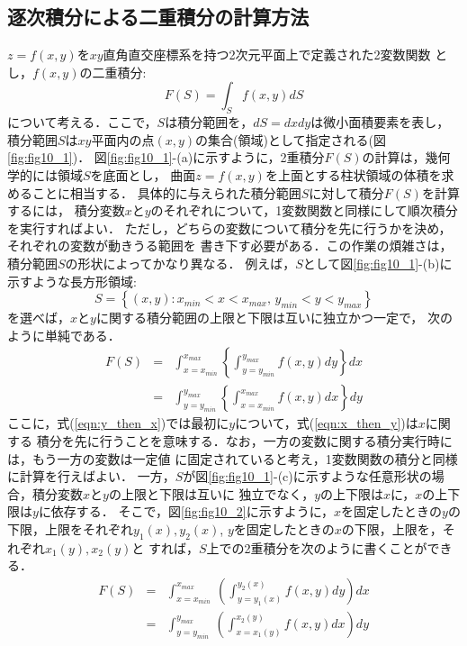 \documentclass[10pt,a4j]{jarticle}
\begin{document}
\subsection{逐次積分による二重積分の計算方法}
$z=f(x,y)$を$xy$直角直交座標系を持つ2次元平面上で定義された2変数関数
とし，$f(x,y)$の二重積分:
\begin{equation}
	F(S)=\int_S f(x,y) dS
	\label{eqn:Int2D}
\end{equation}
について考える．ここで，$S$は積分範囲を，$dS=dxdy$は微小面積要素を表し，
積分範囲$S$は$xy$平面内の点$(x,y)$の集合(領域)として指定される(図\ref{fig:fig10_1})．
図\ref{fig:fig10_1}-(a)に示すように，2重積分$F(S)$の計算は，幾何学的には領域$S$を底面とし，
曲面$z=f(x,y)$を上面とする柱状領域の体積を求めることに相当する．
具体的に与えられた積分範囲$S$に対して積分$F(S)$を計算するには，
積分変数$x$と$y$のそれぞれについて，1変数関数と同様にして順次積分を実行すればよい．
ただし，どちらの変数について積分を先に行うかを決め，それぞれの変数が動きうる範囲を
書き下す必要がある．この作業の煩雑さは，積分範囲$S$の形状によってかなり異なる．
例えば，$S$として図\ref{fig:fig10_1}-(b)に示すような長方形領域:
\begin{equation}
	S=\left\{(x,y):x_{min}<x<x_{max}, \, y_{min}<y<y_{max} \right\}
	\label{eqn:Sa}
\end{equation}
を選べば，$x$と$y$に関する積分範囲の上限と下限は互いに独立かつ一定で，
次のように単純である．
\begin{eqnarray}
	F(S)
	&=&
	\int_{x=x_{min}}^{x_{max}}\left\{\int_{y=y_{min}}^{y_{max}} f(x,y)dy\right\} dx
	\label{eqn:y_then_x}
	\\
	&=&
	\int_{y=y_{min}}^{y_{max}}\left\{\int_{x=x_{min}}^{x_{max}} f(x,y)dx\right\} dy
	\label{eqn:x_then_y}
\end{eqnarray}
ここに，式(\ref{eqn:y_then_x})では最初に$y$について，式(\ref{eqn:x_then_y})は$x$に関する
積分を先に行うことを意味する．なお，一方の変数に関する積分実行時には，もう一方の変数は一定値
に固定されていると考え，1変数関数の積分と同様に計算を行えばよい．
一方，$S$が図\ref{fig:fig10_1}-(c)に示すような任意形状の場合，積分変数$x$と$y$の上限と下限は互いに
独立でなく，$y$の上下限は$x$に，$x$の上下限は$y$に依存する．
そこで，図\ref{fig:fig10_2}に示すように，$x$を固定したときの$y$の下限，上限をそれぞれ$y_1(x),y_2(x)$,
$y$を固定したときの$x$の下限，上限を，それぞれ$x_1(y),x_2(y)$と
すれば，$S$上での2重積分を次のように書くことができる．
\begin{eqnarray}
	F(S) &=& 
	\int_{x=x_{min}}^{x_{max}}\ \left( \int_{y=y_1(x)}^{y_2(x)}f(x,y)dy\right) dx
	\label{eqn:iint_xy}
	\\
	&=& 
	\int_{y=y_{min}}^{y_{max}}\ \left( \int_{x=x_1(y)}^{x_2(y)}f(x,y)dx\right) dy
	\label{eqn:iint_yx}
\end{eqnarray}
\end{document}
